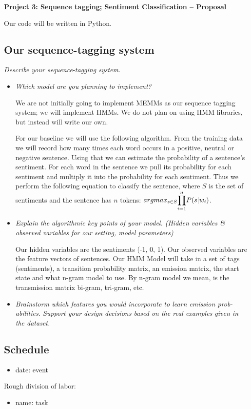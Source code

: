 \documentclass{article}
\begin{document}
\begin{center}\textbf{Project 3: Sequence tagging; Sentiment Classification -- Proposal}\end{center}

Our code will be written in Python.

\subsection*{Our sequence-tagging system}

\textit{Describe your sequence-tagging system.}\par

\begin{itemize}
\item \textit{Which model are you planning to implement?}\par

We are not initially going to implement MEMMs as our sequence tagging system; we will implement HMMs. We do not plan on using HMM libraries, but instead will write our own.

For our baseline we will use the following algorithm. From the training data we will record how many times each word occurs in a positive, neutral or negative sentence. Using that we can estimate the probability of a sentence's sentiment. For each word in the sentence we pull its probability for each sentiment and multiply it into the probability for each sentiment. Thus we perform the following equation to classify the sentence, where $S$ is the set of sentiments and the sentence has $n$ tokens: $argmax_{s \in S}\mathlarger{\prod_{i=1}^n} P(s|w_i)$.

\item \textit{Explain the algorithmic key points of your model. (Hidden variables \& observed variables for our setting, model parameters)}\par

Our hidden variables are the sentiments (-1, 0, 1). Our observed variables are the feature vectors of sentences. Our HMM Model will take in a set of tags (sentiments), a transition probability matrix, an emission matrix, the start state and what n-gram model to use. By n-gram model we mean, is the transmission matrix bi-gram, tri-gram, etc.

\item \textit{Brainstorm which features you would incorporate to learn emission prob-
abilities. Support your design decisions based on the real examples given
in the dataset.}\par

\end{itemize}

\subsection*{Schedule}

\begin{itemize}[noitemsep,nolistsep]
\item date: event
\end{itemize}

Rough division of labor:
\begin{itemize}[noitemsep,nolistsep]
\item name: task
\end{itemize}
\end{document}
